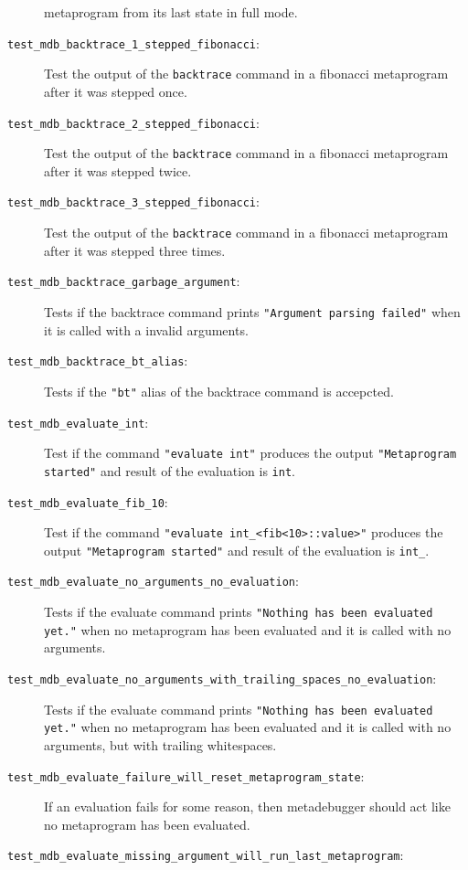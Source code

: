 \begin{description}
        metaprogram from its last state in full mode.
    \item[\texttt{test\_mdb\_backtrace\_1\_stepped\_fibonacci}:]
        Test the output of the \texttt{backtrace} command in a fibonacci
        metaprogram after it was stepped once.
    \item[\texttt{test\_mdb\_backtrace\_2\_stepped\_fibonacci}:]
        Test the output of the \texttt{backtrace} command in a fibonacci
        metaprogram after it was stepped twice.
    \item[\texttt{test\_mdb\_backtrace\_3\_stepped\_fibonacci}:]
        Test the output of the \texttt{backtrace} command in a fibonacci
        metaprogram after it was stepped three times.
    \item[\texttt{test\_mdb\_backtrace\_garbage\_argument}:]
        Tests if the backtrace command prints
        \texttt{"Argument parsing failed"} when it is called with a invalid
        arguments.
    \item[\texttt{test\_mdb\_backtrace\_bt\_alias}:]
        Tests if the \texttt{"bt"} alias of the backtrace command is
        accepcted.
    \item[\texttt{test\_mdb\_evaluate\_int}:]
        Test if the command \texttt{"evaluate int"} produces the output
        \texttt{"Metaprogram started"} and result of the evaluation is
        \texttt{int}.
    \item[\texttt{test\_mdb\_evaluate\_fib\_10}:]
        Test if the command \texttt{"evaluate int\_<fib<10>::value>"} produces
        the output \texttt{"Metaprogram started"} and result of the evaluation
        is \texttt{int\_<55>}.
    \item[\texttt{test\_mdb\_evaluate\_no\_arguments\_no\_evaluation}:]
        Tests if the evaluate command prints
        \texttt{"Nothing has been evaluated yet."} when no metaprogram has been
        evaluated and it is called with no arguments.
    \item[\texttt{test\_mdb\_evaluate\_no\_arguments\_with\_trailing\_spaces\_no\_evaluation}:]
        Tests if the evaluate command prints
        \texttt{"Nothing has been evaluated yet."} when no metaprogram has been
        evaluated and it is called with no arguments, but with trailing
        whitespaces.
    \item[\texttt{test\_mdb\_evaluate\_failure\_will\_reset\_metaprogram\_state}:]
        If an evaluation fails for some reason, then metadebugger should act
        like no metaprogram has been evaluated.
    \item[\texttt{test\_mdb\_evaluate\_missing\_argument\_will\_run\_last\_metaprogram}:]

\end{description}

